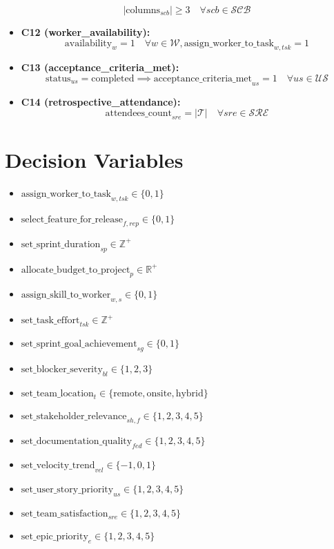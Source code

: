 \documentclass{article}
\begin{document}
\begin{itemize}
    \[
    |\text{columns}_{scb}| \geq 3 \quad \forall scb \in \mathcal{SCB}
    \]
    \item \textbf{C12 (worker\_availability):}
    \[
    \text{availability}_w = 1 \quad \forall w \in \mathcal{W}, \text{assign\_worker\_to\_task}_{w,tsk} = 1
    \]
    \item \textbf{C13 (acceptance\_criteria\_met):}
    \[
    \text{status}_{us} = \text{completed} \implies \text{acceptance\_criteria\_met}_{us} = 1 \quad \forall us \in \mathcal{US}
    \]
    \item \textbf{C14 (retrospective\_attendance):}
    \[
    \text{attendees\_count}_{sre} = |\mathcal{T}| \quad \forall sre \in \mathcal{SRE}
    \]
\end{itemize}

\section{Decision Variables}
\begin{itemize}
    \item $\text{assign\_worker\_to\_task}_{w,tsk} \in \{0,1\}$
    \item $\text{select\_feature\_for\_release}_{f,rep} \in \{0,1\}$
    \item $\text{set\_sprint\_duration}_{sp} \in \mathbb{Z}^+$
    \item $\text{allocate\_budget\_to\_project}_p \in \mathbb{R}^+$
    \item $\text{assign\_skill\_to\_worker}_{w,s} \in \{0,1\}$
    \item $\text{set\_task\_effort}_{tsk} \in \mathbb{Z}^+$
    \item $\text{set\_sprint\_goal\_achievement}_{sg} \in \{0,1\}$
    \item $\text{set\_blocker\_severity}_{bl} \in \{1,2,3\}$
    \item $\text{set\_team\_location}_t \in \{\text{remote}, \text{onsite}, \text{hybrid}\}$
    \item $\text{set\_stakeholder\_relevance}_{sh,f} \in \{1,2,3,4,5\}$
    \item $\text{set\_documentation\_quality}_{fed} \in \{1,2,3,4,5\}$
    \item $\text{set\_velocity\_trend}_{vel} \in \{-1,0,1\}$
    \item $\text{set\_user\_story\_priority}_{us} \in \{1,2,3,4,5\}$
    \item $\text{set\_team\_satisfaction}_{sre} \in \{1,2,3,4,5\}$
    \item $\text{set\_epic\_priority}_e \in \{1,2,3,4,5\}$
\end{itemize}
\end{document}
